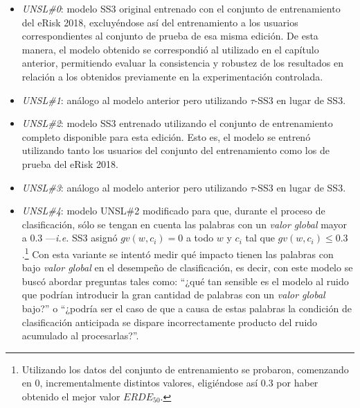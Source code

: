 \begin{itemize}
\item \emph{UNSL\#0}: modelo SS3 original entrenado con el conjunto de entrenamiento del eRisk 2018, excluyéndose así del entrenamiento a los usuarios correspondientes al conjunto de prueba de esa misma edición.
De esta manera, el modelo obtenido se correspondió al utilizado en el capítulo anterior, permitiendo evaluar la consistencia y robustez de los resultados en relación a los obtenidos previamente en la experimentación controlada.
\item \emph{UNSL\#1}: análogo al modelo anterior pero utilizando $\tau$-SS3 en lugar de SS3.
\item \emph{UNSL\#2}: modelo SS3 entrenado utilizando el conjunto de entrenamiento completo disponible para esta edición. Esto es, el modelo se entrenó utilizando tanto los usuarios del conjunto del entrenamiento como los de prueba del eRisk 2018.
\item \emph{UNSL\#3}: análogo al modelo anterior pero utilizando $\tau$-SS3 en lugar de SS3.
\item \emph{UNSL\#4}: modelo UNSL\#2 modificado para que, durante el proceso de clasificación, sólo se tengan en cuenta las palabras con un \emph{valor global} mayor a $0.3$ ---\emph{i.e.} SS3 asignó $gv(w, c_i) = 0$ a todo $w$ y $c_i$ tal que $gv(w, c_i)\leq0.3$.\footnote{Utilizando los datos del conjunto de entrenamiento se probaron, comenzando en $0$, incrementalmente distintos valores, eligiéndose así $0.3$ por haber obtenido el mejor valor $ERDE_{50}$.}
Con esta variante se intentó medir qué impacto tienen las palabras con bajo \emph{valor global} en el desempeño de clasificación, es decir, con este modelo se buscó abordar preguntas tales como: ``¿qué tan sensible es el modelo al ruido que podrían introducir la gran cantidad de palabras con un \emph{valor global} bajo?'' o ``¿podría ser el caso de que a causa de estas palabras la condición de clasificación anticipada se dispare incorrectamente producto del ruido acumulado al procesarlas?''.
\end{itemize}


